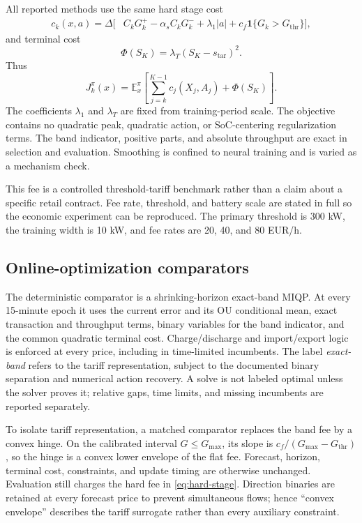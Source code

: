 \documentclass[preprint,11pt]{elsarticle}
\newcommand{\E}{\mathbb{E}}
\newcommand{\abs}[1]{\left\lvert #1\right\rvert}
\theoremstyle{plain}
\theoremstyle{remark}
\begin{document}
All reported methods use the same hard stage cost
\begin{align}
 c_k(x,a)=\Delta\big[&C_kG_k^+-\alpha_s C_kG_k^-
 +\lambda_1\abs{a}
 +c_f\mathbf 1\{G_k>G_{\mathrm{thr}}\}\big],
 \label{eq:hard-stage}
\end{align}
and terminal cost
\begin{equation}
 \Phi(S_K)=\lambda_T(S_K-s_{\mathrm{tar}})^2.
 \label{eq:terminal}
\end{equation}
Thus
\begin{equation}
 J^\pi_k(x)=\E_x^\pi\left[
 \sum_{j=k}^{K-1}c_j(X_j,A_j)+\Phi(S_K)\right].
 \label{eq:common-objective}
\end{equation}
The coefficients $\lambda_1$ and $\lambda_T$ are fixed from training-period
scale. The objective contains no quadratic peak, quadratic action, or
SoC-centering regularization terms. The band indicator,
positive parts, and absolute throughput are exact in selection and evaluation.
Smoothing is confined to neural training and is varied as a mechanism check.

This fee is a controlled threshold-tariff benchmark rather than a claim about
a specific retail contract. Fee rate, threshold, and battery scale are stated
in full so the economic experiment can be reproduced. The primary threshold is
300 kW, the training width is 10 kW, and fee rates are 20, 40, and 80 EUR/h.

\subsection{Online-optimization comparators}

The deterministic comparator is a shrinking-horizon exact-band MIQP. At every
15-minute epoch it uses the current error and its OU conditional mean, exact
transaction and throughput terms, binary variables for the band indicator,
and the common quadratic terminal cost. Charge/discharge and import/export
logic is enforced at every price, including in time-limited incumbents. The
label \emph{exact-band} refers to the tariff representation, subject to the
documented binary separation and numerical action recovery. A solve
is not labeled optimal unless the solver proves it; relative gaps, time limits,
and missing incumbents are reported separately.

To isolate tariff representation, a matched comparator replaces the band fee
by a convex hinge. On the calibrated interval $G\leq G_{\max}$, its slope is
$c_f/(G_{\max}-G_{\mathrm{thr}})$, so the hinge is a convex lower envelope of
the flat fee. Forecast, horizon, terminal cost, constraints, and update timing
are otherwise unchanged. Evaluation still charges the hard fee in
\eqref{eq:hard-stage}. Direction binaries are retained at every forecast
price to prevent simultaneous flows; hence ``convex envelope''
describes the tariff surrogate rather than every auxiliary constraint.
\end{document}
